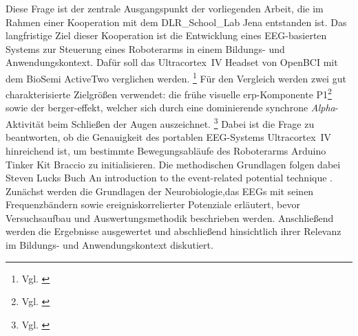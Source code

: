 Diese Frage ist der zentrale Ausgangspunkt der vorliegenden Arbeit, die im Rahmen einer Kooperation mit dem \glqq DLR\_School\_Lab Jena\grqq{} entstanden ist. Das langfristige Ziel dieser Kooperation ist die Entwicklung eines EEG-basierten Systems zur Steuerung eines Roboterarms in einem Bildungs- und Anwendungskontext.
Dafür soll das \glqq Ultracortex~IV\grqq{} Headset von OpenBCI mit dem \glqq BioSemi ActiveTwo\grqq{} verglichen werden. \footnote{Vgl. \cite{openbci_ultracortex_shop}} Für den Vergleich werden zwei gut charakterisierte Zielgrößen verwendet: die frühe visuelle \acrshort{erp}-Komponente \glqq P1\grqq{}\footnote{Vgl. \cite{luck2014}} sowie der \Gls{berger-effekt}, welcher sich durch eine dominierende synchrone \textit{Alpha}-Aktivität beim Schließen der Augen auszeichnet. \footnote{Vgl. \cite{statpearls_eeg}} Dabei ist die Frage zu beantworten, ob die Genauigkeit des portablen EEG-Systems \glqq Ultracortex~IV\grqq{} hinreichend ist, um bestimmte Bewegungsabläufe des Roboterarms \glqq Arduino Tinker Kit Braccio\grqq{} zu initialisieren.
Die methodischen Grundlagen folgen dabei  Steven Lucks Buch \glqq An introduction to the event-related potential technique \grqq{}. Zunächst werden die Grundlagen der Neurobiologie,das EEGs mit seinen Frequenzbändern sowie ereigniskorrelierter Potenziale erläutert, bevor Versuchsaufbau und Auswertungsmethodik beschrieben werden. Anschließend werden die Ergebnisse ausgewertet und abschließend hinsichtlich ihrer Relevanz im Bildungs- und Anwendungskontext diskutiert.

